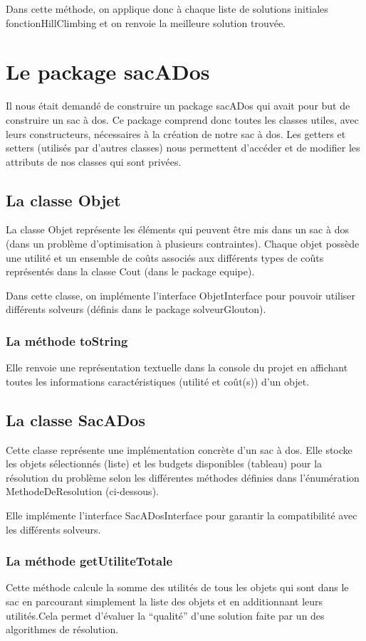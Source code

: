 \documentclass[11pt]{article}
\begin{document}
Dans cette méthode, on applique donc à chaque liste de solutions initiales fonctionHillClimbing et on renvoie la meilleure solution trouvée.  


\section{Le package sacADos}
Il nous était demandé de construire un package sacADos qui avait pour but de construire un sac à dos. 
Ce package comprend donc toutes les classes utiles, avec leurs constructeurs, nécessaires à la création  de notre sac à dos. 
Les getters et setters (utilisés par d’autres classes) nous permettent d’accéder et de modifier les attributs de nos classes qui sont privées.

\subsection{La classe Objet}
La classe Objet représente les éléments qui peuvent être mis dans un sac à dos (dans un problème d’optimisation à plusieurs contraintes). Chaque objet possède une utilité et un ensemble de coûts associés aux différents types de coûts représentés dans la classe Cout (dans le package equipe). 

Dans cette classe, on implémente l'interface ObjetInterface pour pouvoir utiliser différents solveurs (définis dans le package solveurGlouton).

\subsubsection{La méthode toString}

Elle renvoie une représentation textuelle dans la console du projet en affichant toutes les informations caractéristiques (utilité et coût(s)) d’un objet.

\subsection{La classe SacADos}
Cette classe représente une implémentation concrète d’un sac à dos. Elle stocke les objets sélectionnés (liste) et les budgets disponibles (tableau) pour la résolution du problème selon les différentes méthodes définies dans l’énumération MethodeDeResolution (ci-dessous).

Elle implémente l’interface SacADosInterface pour garantir la compatibilité avec les différents solveurs.

\subsubsection{La méthode getUtiliteTotale}
Cette méthode calcule la somme des utilités de tous les objets qui sont dans le sac en parcourant simplement la liste des objets et en additionnant leurs utilités.Cela permet d'évaluer la “qualité” d’une solution faite par un des algorithmes de résolution.
\end{document}
